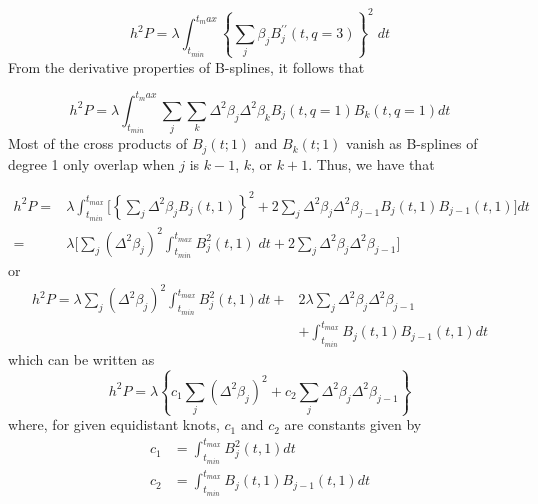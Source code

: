 \documentclass[12pt]{article}
\begin{document}
\begin{equation} \label{eq:osullivan_univariate_bspline_penalty}
h^2 P = \lambda \int_{t_{min}}^{t_max} \left\{ \sum_{j}  \beta_j B_j^{\prime \prime} \left(t, q=3\right) \right\}^2\; dt
\end{equation}
\noindent
From the derivative properties of B-splines, it follows that

\begin{equation} \label{osullivan_univariate_bspline_penalty_via_deriv}
h^2 P = \lambda \int_{t_{min}}^{t_max}  \sum_{j} \sum_{k} \Delta^2 \beta_j \Delta^2 \beta_k B_j\left(t,q=1\right)B_k\left(t,q=1\right) dt 
\end{equation}
\noindent
Most of the cross products of $B_j(t; 1)$ and $B_k(t;1)$ vanish as B-splines of degree 1 only overlap when $j$ is $k-1$, $k$, or $k+1$. Thus, we have that

\begin{align}
h^2 P = {} & \lambda \int_{t_{min}}^{t_{max}} \bigg[ \left\{ \sum_{j}  \Delta^2 \beta_j  B_j\left(t,1\right)  \right\}^2  + 2 \sum_{j}\Delta^2 \beta_j\Delta^2 \beta_{j-1}B_j\left(t,1\right)B_{j-1}\left(t,1\right) \bigg] dt \nonumber \\ 
= {} & \lambda \bigg[ \sum_j \left( \Delta^2\beta_j \right)^2 \int_{t_{min}}^{t_{max}} B_j^2\left(t,1\right)\;dt + 2 \sum_j \Delta^2 \beta_j\Delta^2 \beta_{j-1} \bigg]
\end{align}
\noindent
or
\begin{align}
h^2 P = \lambda \sum_j \left( \Delta^2\beta_j \right)^2 \int_{t_{min}}^{t_{max}} B_j^2\left(t,1\right) dt + {} & 2\lambda \sum_j \Delta^2 \beta_j \Delta^2 \beta_{j-1}  \nonumber \\ 
{} &+\int_{t_{min}}^{t_{max}} B_j\left(t,1\right)B_{j-1}\left(t,1\right) dt
\end{align}
\noindent
which can be written as
\begin{equation} \label{eq:osullivan_penalty_decomp}
h^2 P = \lambda\left\{c_1 \sum_j\left( \Delta^2 \beta_j\right)^2 + c_2 \sum_j\Delta^2 \beta_j\Delta^2 \beta_{j-1} \right\}
\end{equation}
\noindent
where, for given equidistant knots, $c_1$ and $c_2$ are constants given by
\begin{equation}
\begin{split}
c_1 & =   \int_{t_{min}}^{t_{max}} B_j^2\left(t,1\right) dt\\
c_2 & = \int_{t_{min}}^{t_{max}} B_j\left(t,1\right)B_{j-1}\left(t,1\right) dt
\end{split}
\end{equation}
\end{document}
